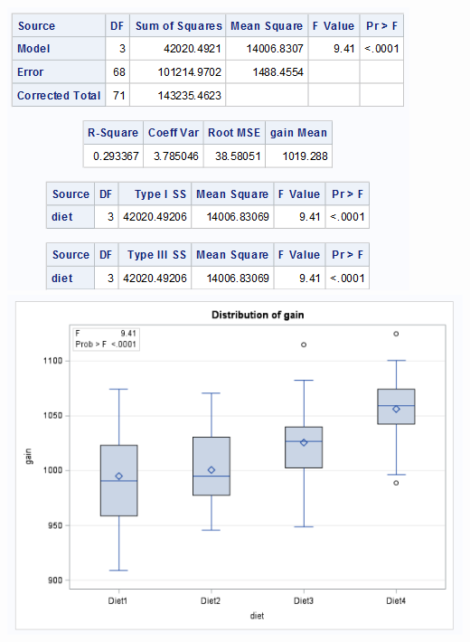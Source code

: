 \begin{center}
\includegraphics[scale=0.8]{ChickensGLM}\includegraphics[scale=0.5]{ChickensBoxPlot}\\

\end{center}
